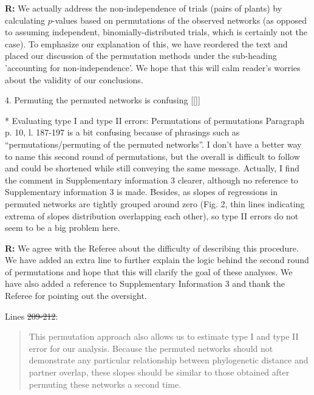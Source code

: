 \documentclass[12pt]{letter}
\newenvironment{refquote}{\bigskip \begin{it}}{\end{it}\smallskip}
\providecommand{\DIFadd}[1]{{\protect\color{blue}\uwave{#1}}} %
\providecommand{\DIFdel}[1]{{\protect\color{red}\sout{#1}}}                      %
\providecommand{\DIFaddbegin}{} %
\providecommand{\DIFaddend}{} %
\providecommand{\DIFdelbegin}{} %
\providecommand{\DIFdelend}{} %
\newcommand{\DIFscaledelfig}{0.5}
\newlength{\DIFdelgraphicswidth} %
\newlength{\DIFdelgraphicsheight} %
\newcommand{\DIFaddincludegraphics}[2][]{{\color{blue}\fbox{\DIFOincludegraphics[#1]{#2}}}} %
\newcommand{\DIFdelincludegraphics}[2][]{%
\sbox{\DIFdelgraphicsbox}{\DIFOincludegraphics[#1]{#2}}%
\settoboxwidth{\DIFdelgraphicswidth}{\DIFdelgraphicsbox} %
\settoboxtotalheight{\DIFdelgraphicsheight}{\DIFdelgraphicsbox} %
\scalebox{\DIFscaledelfig}{%
\parbox[b]{\DIFdelgraphicswidth}{\usebox{\DIFdelgraphicsbox}\\[-\baselineskip] \rule{\DIFdelgraphicswidth}{0em}}\llap{\resizebox{\DIFdelgraphicswidth}{\DIFdelgraphicsheight}{%
\setlength{\unitlength}{\DIFdelgraphicswidth}%
\begin{picture}(1,1)%
\thicklines\linethickness{2pt} %
{\color[rgb]{1,0,0}\put(0,0){\framebox(1,1){}}}%
{\color[rgb]{1,0,0}\put(0,0){\line( 1,1){1}}}%
{\color[rgb]{1,0,0}\put(0,1){\line(1,-1){1}}}%
\end{picture}%
}\hspace*{3pt}}} %
} %
\DeclareRobustCommand{\DIFaddbegin}{\DIFOaddbegin \let\includegraphics\DIFaddincludegraphics} %
\DeclareRobustCommand{\DIFaddend}{\DIFOaddend \let\includegraphics\DIFOincludegraphics} %
\DeclareRobustCommand{\DIFdelbegin}{\DIFOdelbegin \let\includegraphics\DIFdelincludegraphics} %
\DeclareRobustCommand{\DIFdelend}{\DIFOaddend \let\includegraphics\DIFOincludegraphics} %
\begin{document}
	\textbf{R:} We actually address the non-independence of trials (pairs of plants) by calculating $p$-values based on permutations of the observed networks (as opposed to assuming independent, binomially-distributed trials, which is certainly not the case). To emphasize our explanation of this, we have reordered the text and placed our discussion of the permutation methods under the sub-heading 'accounting for non-independence'. We hope that this will calm reader's worries about the validity of our conclusions.


4. Permuting the permuted networks is confusing \DIFaddbegin [[\DIFadd{done}]]
\DIFaddend 

	\begin{refquote}
		* Evaluating type I and type II errors: Permutations of permutations
		\DIFdelbegin %
\DIFdelend Paragraph p. 10, l. 187-197 is a bit confusing because of phrasings such as “permutations/permuting of the permuted networks”. I don't have a better way to name this second round of permutations, but the overall is difficult to follow and could be shortened while still conveying the same message.
		Actually, I find the comment in Supplementary information 3 clearer, although no reference to Supplementary information 3 is made.
		Besides, as slopes of regressions in permuted networks are tightly grouped around zero (Fig. 2, thin lines indicating 
		extrema of slopes distribution overlapping each other), so type II errors do not seem to be a big problem here.
	\end{refquote}


	\textbf{R:} We agree with the Referee about the difficulty of describing this procedure. We have added an extra line to further explain the logic behind the second round of permutations and hope that this will clarify the goal of these analyses. We have also added a reference to Supplementary Information 3 and thank the Referee for pointing out the oversight.


	Lines \DIFdelbegin \DIFdel{209-212}\DIFdelend \DIFaddbegin \DIFadd{XX-XX}\DIFaddend :

	\begin{quotation}
		\DIFdelbegin %

\DIFdelend This permutation approach also allows us to estimate type I and type II 
	    error for our analysis. Because the permuted networks should not demonstrate any particular relationship between phylogenetic distance and partner overlap, these slopes should be similar to those obtained after permuting these networks a second time.
	\DIFdelbegin %

\DIFdelend \end{quotation}
\end{document}
